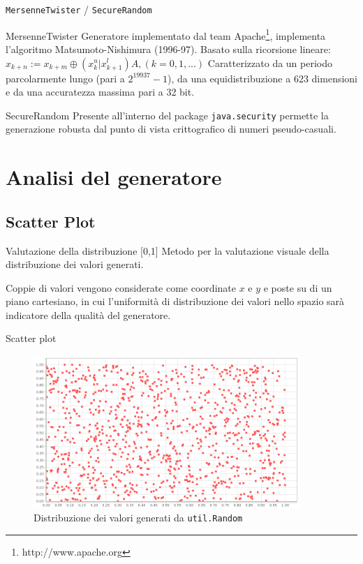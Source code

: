 \documentclass[slidestop,compress,mathserif]{beamer}
\begin{document}
\begin{frame}{{\tt MersenneTwister} / {\tt SecureRandom}}
\begin{block}{MersenneTwister}
Generatore implementato dal team Apache\footnote{http://www.apache.org}, implementa l'algoritmo  Matsumoto-Nishimura (1996-97). 
Basato sulla ricorsione lineare:
$x_{k+n}:=x_{k+m} \oplus (x_{k}^{u}|x_{k+1}^{l})A, (k=0,1,...)$
Caratterizzato da un periodo parcolarmente lungo (pari a $2^{19937}-1$), da una equidistribuzione a 623 dimensioni e da una accuratezza massima pari a 32 bit.
\end{block}
\begin{block}{SecureRandom}
Presente all'interno del package {\tt java.security} permette la generazione robusta dal punto di vista crittografico di numeri pseudo-casuali.
\end{block}
\end{frame}

\section{Analisi del generatore}
\subsection{Scatter Plot}
\begin{frame}{Valutazione della distribuzione [0,1]}
\vfill
Metodo per la valutazione visuale della distribuzione dei valori generati.

Coppie di valori vengono considerate come coordinate $x$ e $y$ e poste su di un piano cartesiano, in cui l'uniformit\`a di distribuzione dei valori nello spazio sar\`a indicatore della qualit\`a del generatore.
\vfill
\end{frame}

\begin{frame}{Scatter plot}
\begin{figure}[!h]{
	\begin{center}
	   \includegraphics[width=0.9\textwidth]{figures/random.png}
	\end{center}}
	\caption{Distribuzione dei valori generati da {\tt util.Random}}
	\label{fig:random}
\end{figure}
\end{frame}
\end{document}
